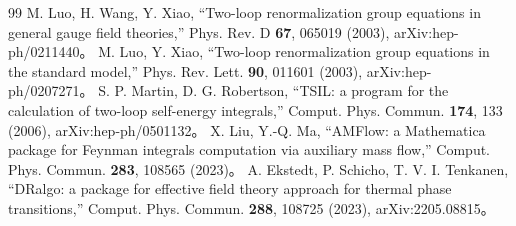\documentclass[a4paper,10pt]{ltjsarticle}
\begin{document}
\begin{thebibliography}{99}
 M. Luo, H. Wang, Y. Xiao, ``Two-loop renormalization group equations in general gauge field theories,'' Phys. Rev. D \textbf{67}, 065019 (2003), arXiv:hep-ph/0211440。
 M. Luo, Y. Xiao, ``Two-loop renormalization group equations in the standard model,'' Phys. Rev. Lett. \textbf{90}, 011601 (2003), arXiv:hep-ph/0207271。
 S. P. Martin, D. G. Robertson, ``TSIL: a program for the calculation of two-loop self-energy integrals,'' Comput. Phys. Commun. \textbf{174}, 133 (2006), arXiv:hep-ph/0501132。
 X. Liu, Y.-Q. Ma, ``AMFlow: a Mathematica package for Feynman integrals computation via auxiliary mass flow,'' Comput. Phys. Commun. \textbf{283}, 108565 (2023)。
 A. Ekstedt, P. Schicho, T. V. I. Tenkanen, ``DRalgo: a package for effective field theory approach for thermal phase transitions,'' Comput. Phys. Commun. \textbf{288}, 108725 (2023), arXiv:2205.08815。
\end{thebibliography}
\end{document}
